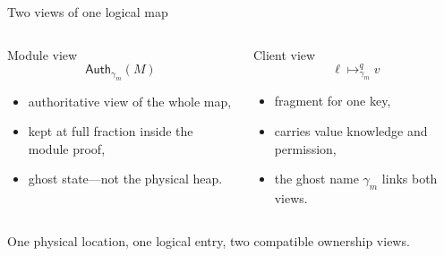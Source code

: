 \documentclass[aspectratio=169,10pt]{beamer}
\newcommand{\AuthM}[1]{\mathsf{Auth}_{\gamma_m}(#1)}
\newcommand{\ptfrac}[3]{#1\mathrel{\mapsto_{\gamma_m}^{#2}}#3}
\begin{document}
\begin{frame}{Two views of one logical map}
  \begin{columns}[T,onlytextwidth]
      \begin{block}{Module view}
        \[
          \AuthM{M}
        \]
        \begin{itemize}
          \item authoritative view of the whole map,
          \item kept at full fraction inside the module proof,
          \item ghost state---not the physical heap.
        \end{itemize}
      \end{block}
      \begin{block}{Client view}
        \[
          \ptfrac{\ell}{q}{v}
        \]
        \begin{itemize}
          \item fragment for one key,
          \item carries value knowledge and permission,
          \item the ghost name \(\gamma_m\) links both views.
        \end{itemize}
      \end{block}
  \end{columns}

  \vspace{0.45cm}
  \begin{center}
    \large One physical location, one logical entry, two compatible ownership views.
  \end{center}
\end{frame}
\end{document}
